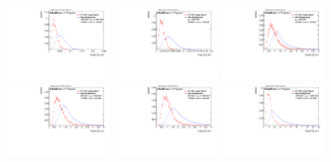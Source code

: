 \begin{figure}[H]
\includegraphics[width=0.3\textwidth]{sascha_input/Appendix/Distributions/w/distributions/beta1/h_normal_tj_C2_bin5.pdf} \hspace{1mm}
\includegraphics[width=0.3\textwidth]{sascha_input/Appendix/Distributions/w/distributions/beta1/h_normal_tj_C2_bin6.pdf} 
\bigskip
\includegraphics[width=0.3\textwidth]{sascha_input/Appendix/Distributions/w/distributions/beta1/h_normal_tj_D2_bin1.pdf} \hspace{1mm}
\includegraphics[width=0.3\textwidth]{sascha_input/Appendix/Distributions/w/distributions/beta1/h_normal_tj_D2_bin2.pdf} \hspace{1mm}
\includegraphics[width=0.3\textwidth]{sascha_input/Appendix/Distributions/w/distributions/beta1/h_normal_tj_D2_bin3.pdf} 
\bigskip
\includegraphics[width=0.3\textwidth]{sascha_input/Appendix/Distributions/w/distributions/beta1/h_normal_tj_D2_bin4.pdf} \hspace{1mm}

\end{figure}
